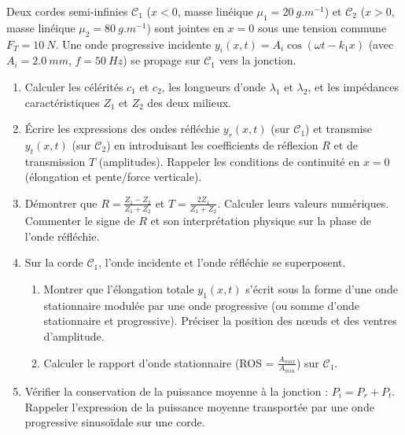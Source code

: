 \documentclass[11pt]{article}
\begin{document}
\begin{exercice}
Deux cordes semi-infinies $\mathcal{C}_1$ ($x<0$, masse linéique $\mu_1 = \SI{20}{g.m^{-1}}$) et $\mathcal{C}_2$ ($x>0$, masse linéique $\mu_2 = \SI{80}{g.m^{-1}}$) sont jointes en $x=0$ sous une tension commune $F_T = \SI{10}{N}$. Une onde progressive incidente $y_i(x,t) = A_i \cos(\omega t - k_1 x)$ (avec $A_i = \SI{2,0}{mm}$, $f = \SI{50}{Hz}$) se propage sur $\mathcal{C}_1$ vers la jonction.
\begin{enumerate}
    \item Calculer les célérités $c_1$ et $c_2$, les longueurs d'onde $\lambda_1$ et $\lambda_2$, et les impédances caractéristiques $Z_1$ et $Z_2$ des deux milieux.
    \item Écrire les expressions des ondes réfléchie $y_r(x,t)$ (sur $\mathcal{C}_1$) et transmise $y_t(x,t)$ (sur $\mathcal{C}_2$) en introduisant les coefficients de réflexion $R$ et de transmission $T$ (amplitudes). Rappeler les conditions de continuité en $x=0$ (élongation et pente/force verticale).
    \item Démontrer que $R = \frac{Z_1 - Z_2}{Z_1 + Z_2}$ et $T = \frac{2Z_1}{Z_1 + Z_2}$. Calculer leurs valeurs numériques. Commenter le signe de $R$ et son interprétation physique sur la phase de l'onde réfléchie.
    \item Sur la corde $\mathcal{C}_1$, l'onde incidente et l'onde réfléchie se superposent. 
    \begin{enumerate}
        \item Montrer que l'élongation totale $y_1(x,t)$ s'écrit sous la forme d'une onde stationnaire modulée par une onde progressive (ou somme d'onde stationnaire et progressive). Préciser la position des nœuds et des ventres d'amplitude.
        \item Calculer le rapport d'onde stationnaire (ROS = $\frac{A_{max}}{A_{min}}$) sur $\mathcal{C}_1$.
    \end{enumerate}
    \item Vérifier la conservation de la puissance moyenne à la jonction : $P_i = P_r + P_t$. Rappeler l'expression de la puissance moyenne transportée par une onde progressive sinusoïdale sur une corde.
\end{enumerate}
\end{exercice}
\end{document}
